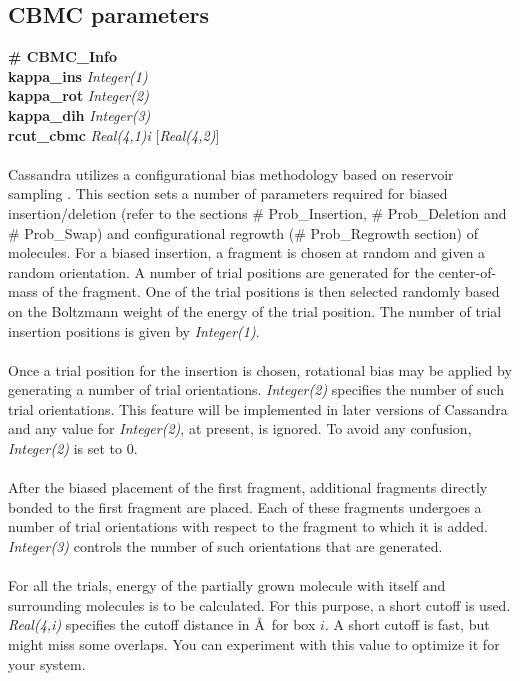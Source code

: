 \subsection{CBMC parameters}\label{sec:CBMC_Info}
{\bf \# CBMC\_Info} \\
{\bf kappa\_ins} {\it Integer(1)} \\
{\bf kappa\_rot} {\it Integer(2)} \\
{\bf kappa\_dih} {\it Integer(3)} \\
{\bf rcut\_cbmc} {\it Real(4,1)i} [{\it Real(4,2)}] \\ \\
%
Cassandra utilizes a configurational bias methodology based on reservoir sampling \cite{Shah:2011}.
This section sets a number of parameters required for biased insertion/deletion (refer to the sections
\# Prob\_Insertion, \# Prob\_Deletion and \# Prob\_Swap) and configurational
regrowth (\# Prob\_Regrowth section) of molecules. For a biased insertion, a fragment is chosen at random and given
a random orientation. A number of trial positions are generated for the center-of-mass of the fragment.
One of the trial positions is then selected randomly based on the Boltzmann weight of the energy of
the trial position. The number of trial insertion positions is given by {\it Integer(1)}. \\ \\
%
Once a trial position for the insertion is chosen, rotational bias may be applied by generating a number
of trial orientations. {\it Integer(2)} specifies the number of such trial orientations. This feature will be
implemented in later versions of Cassandra and any value for {\it Integer(2)}, at present, is ignored.
To avoid any confusion, {\it Integer(2)} is set to 0. \\ \\
%
After the biased placement of the first fragment, additional fragments directly bonded to the first fragment
are placed. Each of these fragments undergoes a number of trial orientations with  respect
to the fragment to which it is added. {\it Integer(3)} controls the number of such orientations that are
generated. \\ \\
%
For all the trials, energy of the partially grown molecule with itself and surrounding molecules is to be calculated. 
For this purpose, a short cutoff is used. {\it Real(4,i)} specifies the cutoff distance in \AA\ for box $i$. 
A short cutoff is fast, but might miss some overlaps. You can experiment with this value to optimize it for your system.\\ \\
